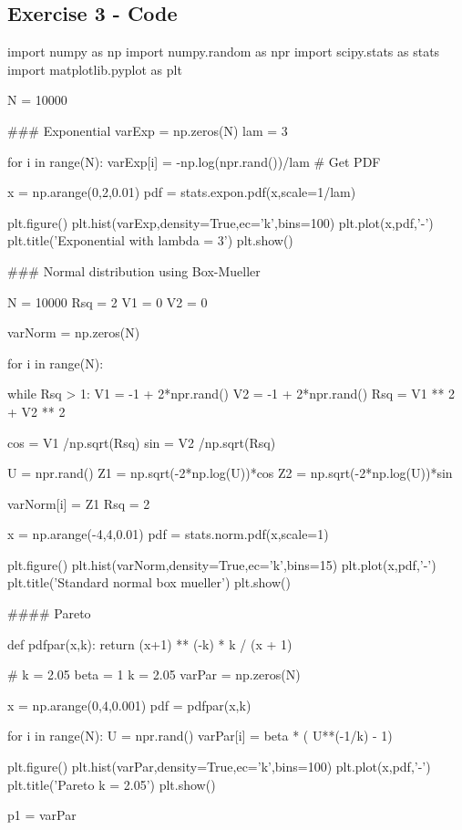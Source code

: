 \subsection*{Exercise 3 - Code}
\begin{python}
import numpy as np
import numpy.random as npr
import scipy.stats as stats
import matplotlib.pyplot as plt


N = 10000

### Exponential
varExp = np.zeros(N)
lam = 3

for i in range(N):
    varExp[i] = -np.log(npr.rand())/lam
# Get PDF

x = np.arange(0,2,0.01)
pdf = stats.expon.pdf(x,scale=1/lam)


plt.figure()
plt.hist(varExp,density=True,ec='k',bins=100)
plt.plot(x,pdf,'-')
plt.title('Exponential with lambda = 3')
plt.show()


### Normal distribution using Box-Mueller

N = 10000
Rsq = 2
V1 = 0
V2 = 0

varNorm = np.zeros(N)

for i in range(N):

    while Rsq > 1:
        V1 = -1 + 2*npr.rand()
        V2 = -1 + 2*npr.rand()
        Rsq = V1 ** 2 + V2 ** 2

    cos = V1 /np.sqrt(Rsq)
    sin = V2 /np.sqrt(Rsq)

    U = npr.rand()
    Z1 = np.sqrt(-2*np.log(U))*cos
    Z2 = np.sqrt(-2*np.log(U))*sin


    varNorm[i] = Z1
    Rsq = 2

x = np.arange(-4,4,0.01)
pdf = stats.norm.pdf(x,scale=1)


plt.figure()
plt.hist(varNorm,density=True,ec='k',bins=15)
plt.plot(x,pdf,'-')
plt.title('Standard normal box mueller')
plt.show()


#### Pareto


def pdfpar(x,k):
    return (x+1) ** (-k) * k / (x + 1)

# k = 2.05
beta = 1
k = 2.05
varPar = np.zeros(N)


x = np.arange(0,4,0.001)
pdf = pdfpar(x,k)


for i in range(N):
    U = npr.rand()
    varPar[i] = beta * ( U**(-1/k) - 1)

plt.figure()
plt.hist(varPar,density=True,ec='k',bins=100)
plt.plot(x,pdf,'-')
plt.title('Pareto k = 2.05')
plt.show()

p1 = varPar




\end{python}
